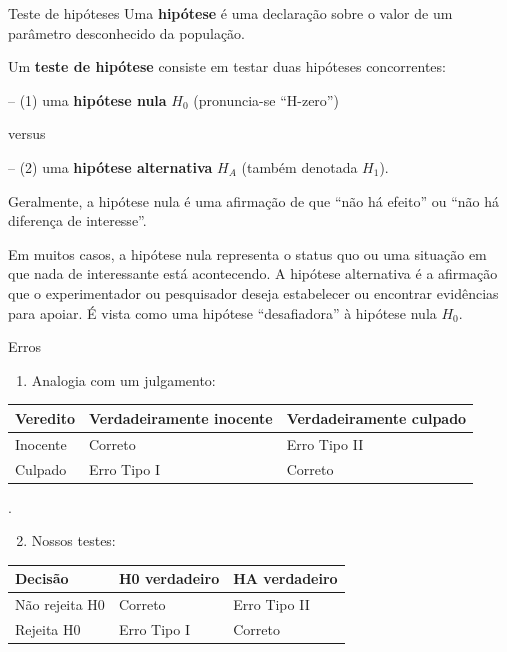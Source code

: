 \documentclass[
  9pt,
  ignorenonframetext,
  aspectratio=169]{beamer}
\providecommand{\tightlist}{%
  \setlength{\itemsep}{0pt}\setlength{\parskip}{0pt}}
\begin{document}
\begin{frame}{Teste de hipóteses}
\protect\hypertarget{teste-de-hipuxf3teses-1}{}
Uma \textbf{hipótese} é uma declaração sobre o valor de um parâmetro
desconhecido da população.

Um \textbf{teste de hipótese } consiste em testar duas hipóteses
concorrentes:

-- (1) uma \textbf{hipótese nula} \(H_0\) (pronuncia-se ``H-zero'')

versus

-- (2) uma \textbf{hipótese alternativa} \(H_A\) (também denotada
\(H_1\)).

Geralmente, a hipótese nula é uma afirmação de que ``não há efeito'' ou
``não há diferença de interesse''.

Em muitos casos, a hipótese nula representa o status quo ou uma situação
em que nada de interessante está acontecendo. A hipótese alternativa é a
afirmação que o experimentador ou pesquisador deseja estabelecer ou
encontrar evidências para apoiar. É vista como uma hipótese
``desafiadora'' à hipótese nula \(H_0\).
\end{frame}

\begin{frame}{Erros}
\protect\hypertarget{erros}{}
\begin{enumerate}
\tightlist
\item
  Analogia com um julgamento:
\end{enumerate}

\begin{tabular}{l|l|l}
\hline
Veredito & Verdadeiramente inocente & Verdadeiramente culpado\\
\hline
Inocente & Correto & Erro Tipo II\\
\hline
Culpado & Erro Tipo I & Correto\\
\hline
\end{tabular}

.

\begin{enumerate}
\setcounter{enumi}{1}
\tightlist
\item
  Nossos testes:
\end{enumerate}

\begin{tabular}{l|l|l}
\hline
Decisão & H0 verdadeiro & HA verdadeiro\\
\hline
Não rejeita H0 & Correto & Erro Tipo II\\
\hline
Rejeita H0 & Erro Tipo I & Correto\\
\hline
\end{tabular}
\end{frame}
\end{document}
